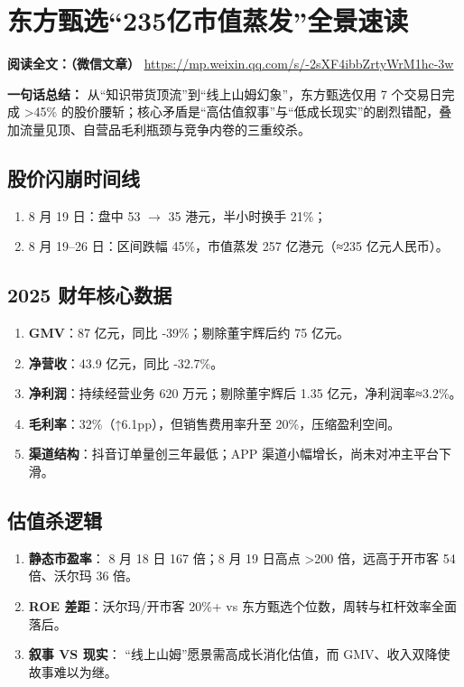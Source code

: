 \clearpage

\section{东方甄选“235亿市值蒸发”全景速读}
\vspace{1cm}
\noindent\textbf{阅读全文：（微信文章）} \url{https://mp.weixin.qq.com/s/-2sXF4ibbZrtyWrM1hc-3w}    

\textbf{一句话总结：}  
从“知识带货顶流”到“线上山姆幻象”，东方甄选仅用 7 个交易日完成 >45\% 的股价腰斩；{\color{red}核心矛盾是“高估值叙事”与“低成长现实”的剧烈错配}，叠加流量见顶、自营品毛利瓶颈与竞争内卷的三重绞杀。

\subsection{股价闪崩时间线}
\begin{enumerate}[leftmargin=*, nosep]
    \item 8 月 19 日：盘中 53 $\rightarrow$ 35 港元，半小时换手 21\%；  
    \item 8 月 19–26 日：区间跌幅 45\%，市值蒸发 257 亿港元（≈235 亿元人民币）。
\end{enumerate}

\subsection{2025 财年核心数据}
\begin{enumerate}[leftmargin=*, nosep]
    \item \textbf{GMV}：87 亿元，同比 ‑39\%；剔除董宇辉后约 75 亿元。  
    \item \textbf{净营收}：43.9 亿元，同比 ‑32.7\%。  
    \item \textbf{净利润}：持续经营业务 620 万元；剔除董宇辉后 1.35 亿元，净利润率≈3.2\%。  
    \item \textbf{毛利率}：32\%（↑6.1pp），但销售费用率升至 20\%，压缩盈利空间。  
    \item \textbf{渠道结构}：抖音订单量创三年最低；APP 渠道小幅增长，尚未对冲主平台下滑。  
\end{enumerate}

\subsection{估值杀逻辑}
\begin{enumerate}[leftmargin=*, nosep]
    \item \textbf{静态市盈率}：  
    8 月 18 日 167 倍；8 月 19 日高点 >200 倍，远高于开市客 54 倍、沃尔玛 36 倍。  
    \item \textbf{ROE 差距}：沃尔玛/开市客 20\%+ vs 东方甄选个位数，周转与杠杆效率全面落后。  
    \item \textbf{叙事 VS 现实}：  
    “线上山姆”愿景需高成长消化估值，而 GMV、收入双降使故事难以为继。
\end{enumerate}

